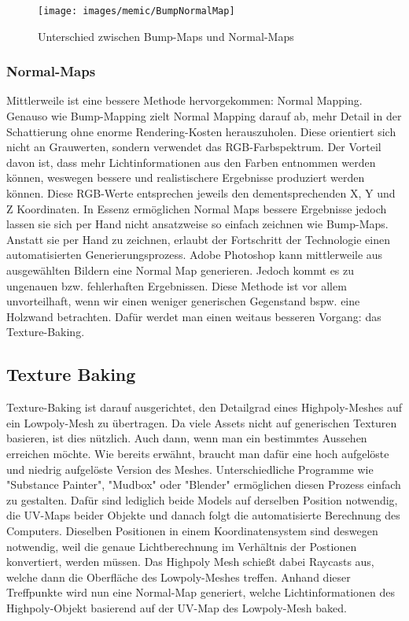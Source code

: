 \begin{figure}[H]
	\centering
	\texttt{[image: images/memic/BumpNormalMap]}
	\caption{Unterschied zwischen Bump-Maps und Normal-Maps}
\end{figure}
\cite{_bumpNormal}

\subsubsection{Normal-Maps}

Mittlerweile ist eine bessere Methode hervorgekommen: Normal Mapping. Genauso wie Bump-Mapping zielt Normal Mapping darauf ab, mehr Detail in der Schattierung ohne enorme Rendering-Kosten herauszuholen. Diese orientiert sich nicht an Grauwerten, sondern verwendet das RGB-Farbspektrum. Der Vorteil davon ist, dass mehr Lichtinformationen aus den Farben entnommen werden können, weswegen bessere und realistischere Ergebnisse produziert werden können. Diese RGB-Werte entsprechen jeweils den dementsprechenden X, Y und Z Koordinaten.
In Essenz ermöglichen Normal Maps bessere Ergebnisse jedoch lassen sie sich per Hand nicht ansatzweise so einfach zeichnen wie Bump-Maps. Anstatt sie per Hand zu zeichnen, erlaubt der Fortschritt der Technologie einen automatisierten Generierungsprozess. Adobe Photoshop kann mittlerweile aus ausgewählten Bildern eine Normal Map generieren. Jedoch kommt es zu ungenauen bzw. fehlerhaften Ergebnissen. Diese Methode ist vor allem unvorteilhaft, wenn wir einen weniger generischen Gegenstand bspw. eine Holzwand betrachten. Dafür werdet man einen weitaus besseren Vorgang: das Texture-Baking.

\subsection{Texture Baking}
Texture-Baking ist darauf ausgerichtet, den Detailgrad eines Highpoly-Meshes auf ein Lowpoly-Mesh zu übertragen. Da viele Assets nicht auf generischen Texturen basieren, ist dies nützlich. Auch dann, wenn man ein bestimmtes Aussehen erreichen möchte.\cite[8]{_highpoly_to_lowpoly} Wie bereits erwähnt, braucht man dafür eine hoch aufgelöste und niedrig aufgelöste Version des Meshes. Unterschiedliche Programme wie "Substance Painter", "Mudbox" oder "Blender" ermöglichen diesen Prozess einfach zu gestalten. Dafür sind lediglich beide Models auf derselben Position notwendig, die UV-Maps beider Objekte und danach folgt die automatisierte Berechnung des Computers. Dieselben Positionen in einem Koordinatensystem sind deswegen notwendig, weil die genaue Lichtberechnung im Verhältnis der Postionen konvertiert, werden müssen. Das Highpoly Mesh schießt dabei Raycasts aus, welche dann die Oberfläche des Lowpoly-Meshes treffen. Anhand dieser Treffpunkte wird nun eine Normal-Map generiert, welche Lichtinformationen des Highpoly-Objekt basierend auf der UV-Map des Lowpoly-Mesh baked.

